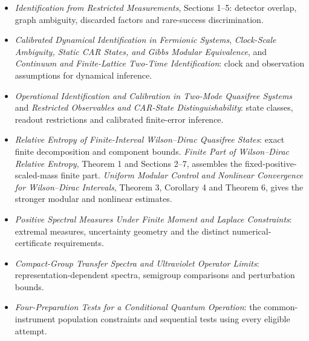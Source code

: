 \documentclass[11pt,letterpaper]{article}
\begin{document}
\begin{itemize}
\item \emph{Identification from Restricted Measurements}, Sections 1--5: detector overlap, graph ambiguity, discarded factors and rare-success discrimination.
\item \emph{Calibrated Dynamical Identification in Fermionic Systems}, \emph{Clock-Scale Ambiguity, Static CAR States, and Gibbs Modular Equivalence}, and \emph{Continuum and Finite-Lattice Two-Time Identification}: clock and observation assumptions for dynamical inference.
\item \emph{Operational Identification and Calibration in Two-Mode Quasifree Systems} and \emph{Restricted Observables and CAR-State Distinguishability}: state classes, readout restrictions and calibrated finite-error inference.
\item \emph{Relative Entropy of Finite-Interval Wilson--Dirac Quasifree States}: exact finite decomposition and component bounds. \emph{Finite Part of Wilson--Dirac Relative Entropy}, Theorem 1 and Sections 2--7, assembles the fixed-positive-scaled-mass finite part. \emph{Uniform Modular Control and Nonlinear Convergence for Wilson--Dirac Intervals}, Theorem 3, Corollary 4 and Theorem 6, gives the stronger modular and nonlinear estimates.
\item \emph{Positive Spectral Measures Under Finite Moment and Laplace Constraints}: extremal measures, uncertainty geometry and the distinct numerical-certificate requirements.
\item \emph{Compact-Group Transfer Spectra and Ultraviolet Operator Limits}: representation-dependent spectra, semigroup comparisons and perturbation bounds.
\item \emph{Four-Preparation Tests for a Conditional Quantum Operation}: the common-instrument population constraints and sequential tests using every eligible attempt.
\end{itemize}
\end{document}
